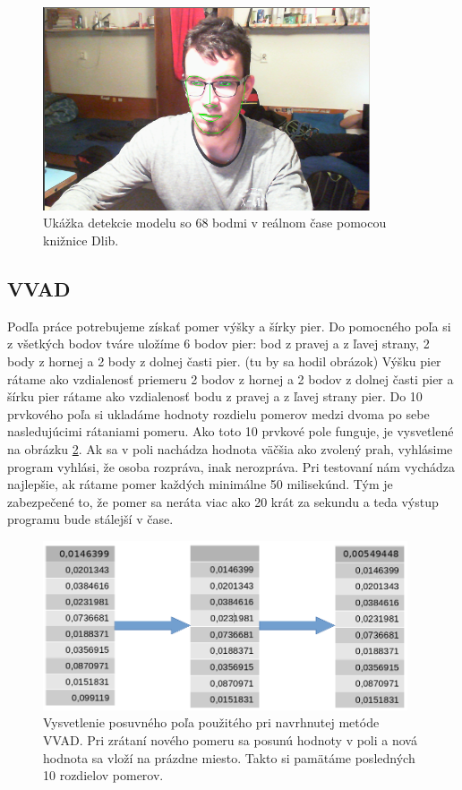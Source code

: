 \begin{figure}[H]
	\begin{center}
		\includegraphics[height=6cm]{pics/detekciaKsicht.png}
		\caption{Ukážka detekcie modelu so 68 bodmi v reálnom čase pomocou knižnice Dlib.}
		\label{pic-detekciaKsicht}
	\end{center}
\end{figure}

\subsection{VVAD}

Podľa práce \cite{aoki2007voice} potrebujeme získať pomer výšky a šírky pier.
Do pomocného poľa si z všetkých bodov tváre uložíme 6 bodov pier: bod z pravej a z ľavej strany, 2 body z hornej a 2 body z dolnej časti pier. 
(tu by sa hodil obrázok)
Výšku pier rátame ako vzdialenosť priemeru 2 bodov z hornej a 2 bodov z dolnej časti pier a šírku pier rátame ako vzdialenosť bodu z pravej a z ľavej strany pier.
Do 10 prvkového poľa si ukladáme hodnoty rozdielu pomerov medzi dvoma po sebe nasledujúcimi rátaniami pomeru. 
Ako toto 10 prvkové pole funguje, je vysvetlené na obrázku \ref{pic-vysvetleniePosuvnehoPola}.
Ak sa v poli nachádza hodnota väčšia ako zvolený prah, vyhlásime program vyhlási, že osoba rozpráva, inak nerozpráva.
Pri testovaní nám vychádza najlepšie, ak rátame pomer každých minimálne 50 milisekúnd.
Tým je zabezpečené to, že pomer sa neráta viac ako 20 krát za sekundu a teda výstup programu bude stálejší v čase.

\begin{figure}[H]
	\begin{center}
		\includegraphics[height=5cm]{pics/vysvetleniePosuvnehoPola.png}
		\caption{Vysvetlenie posuvného poľa použitého pri navrhnutej metóde VVAD. 
		Pri zrátaní nového pomeru sa posunú hodnoty v poli a nová hodnota sa vloží na prázdne miesto. 
		Takto si pamätáme posledných 10 rozdielov pomerov.}
		\label{pic-vysvetleniePosuvnehoPola}
	\end{center}
\end{figure}

